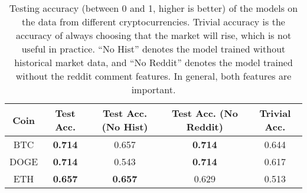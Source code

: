 \documentclass{article}
\begin{document}
\begin{table}
	\centering
	\caption{
        Testing accuracy (between 0 and 1, higher is better) of 
        the models on the data from different cryptocurrencies.
        Trivial accuracy is the accuracy of always choosing that the market will rise,
        which is not useful in practice. ``No Hist'' denotes the model trained
        without historical market data, and ``No Reddit'' denotes the model trained
        without the reddit comment features. In general, both features
        are important.
	}
    \begin{tabular}{ccccc} \toprule
        Coin & Test Acc. & Test Acc. (No Hist) & Test Acc. (No Reddit) & Trivial Acc. \\
    \midrule
        BTC & \bf{0.714} & 0.657 & \bf{0.714} & 0.644 \\
        DOGE & \bf{0.714} & 0.543 &  \bf{0.714} & 0.617 \\
        ETH & \bf{0.657} &  \bf{0.657} & 0.629 & 0.513 \\
    \bottomrule
    \end{tabular}
    \vspace{-15pt}
\end{table}
\end{document}
